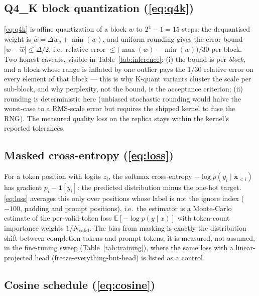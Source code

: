 \documentclass[11pt,a4paper]{article}
\theoremstyle{plain}
\theoremstyle{definition}
\begin{document}
\subsection{Q4\_K block quantization \texorpdfstring{(\eqref{eq:q4k})}{}}
\label{app:q4k}

\eqref{eq:q4k} is affine quantization of a block $w$ to $2^4-1=15$ steps:
the dequantised weight is $\hat w=\Delta w_q+\min(w)$, and uniform
rounding gives the error bound $|w-\hat w|\le\Delta/2$, i.e.\ relative
error $\le\big(\max(w)-\min(w)\big)/30$ per block. Two honest caveats,
visible in Table~\ref{tab:inference}: (i) the bound is per \emph{block},
and a block whose range is inflated by one outlier pays the $1/30$
relative error on every element of that block --- this is why K-quant
variants cluster the scale per sub-block, and why perplexity, not the
bound, is the acceptance criterion; (ii) rounding is deterministic here
(unbiased stochastic rounding would halve the worst-case to a RMS-scale
error but requires the shipped kernel to fuse the RNG). The measured
quality loss on the replica stays within the kernel's reported
tolerances.

\subsection{Masked cross-entropy \texorpdfstring{(\eqref{eq:loss})}{}}
\label{app:loss}

For a token position with logits $z_i$, the softmax cross-entropy
$-\log p(y_i\mid\mathbf{x}_{<i})$ has gradient
$p_i-\mathbf{1}[y_i]$: the predicted distribution minus the one-hot
target. \eqref{eq:loss} averages this only over positions whose label
is not the ignore index ($-100$, padding and prompt positions), i.e.\
the estimator is a Monte-Carlo estimate of the per-valid-token loss
$\mathbb{E}[-\log p(y\mid x)]$ with token-count importance weights $1/N_{\text{valid}}$.
The bias from masking is exactly the distribution shift between
completion tokens and prompt tokens; it is measured, not assumed, in the
fine-tuning sweep (Table~\ref{tab:training}), where the same loss with a
linear-projected head (freeze-everything-but-head) is listed as a control.

\subsection{Cosine schedule \texorpdfstring{(\eqref{eq:cosine})}{}}
\label{app:cosine}
\end{document}
